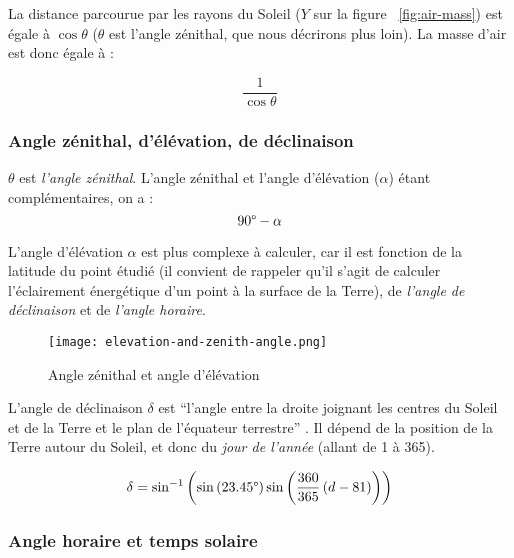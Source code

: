 \documentclass[12pt]{article}
\begin{document}
La distance parcourue par les rayons du Soleil ($Y$ sur la figure ~\ref{fig:air-mass}) est égale à $\cos \theta$ ($\theta$ est l'angle zénithal, que nous décrirons plus loin).
La masse d'air est donc égale à :

\[\frac{1 }{\cos \theta}\]


\subsubsection{Angle zénithal, d'élévation, de déclinaison}
$\theta$ est \emph{l'angle zénithal}. L'angle zénithal et l'angle d'élévation ($\alpha$) étant complémentaires, on a :
\[90\degree - \alpha\]

L'angle d'élévation $\alpha$ est plus complexe à calculer, car il est fonction de la latitude du point étudié (il convient de rappeler qu'il s'agit de calculer l'éclairement énergétique d'un point à la surface de la Terre), de \emph{l'angle de déclinaison} et de \emph{l'angle horaire}.

\begin{figure}[!ht]
	\centerline{\texttt{[image: elevation-and-zenith-angle.png]}}
	\caption{Angle zénithal et angle d'élévation}
	\label{fig:elevation-and-zenith-angle}
\end{figure}

L'angle de déclinaison $\delta$ est ``l'angle entre la droite joignant les centres du Soleil et de la Terre et le plan de l'équateur terrestre'' \cite{mouvement_terre}. Il dépend de la position de la Terre autour du Soleil, et donc du \emph{jour de l'année} (allant de 1 à 365).


\[
	\delta = \sin^{-1} \left(
		\sin \left( 23.45\degree \right)
		\sin \left(
			\frac{360}{365}
			\left(
				d - 81
			\right)
		\right)
	\right)
\]



\subsubsection{Angle horaire et temps solaire} %
\end{document}
